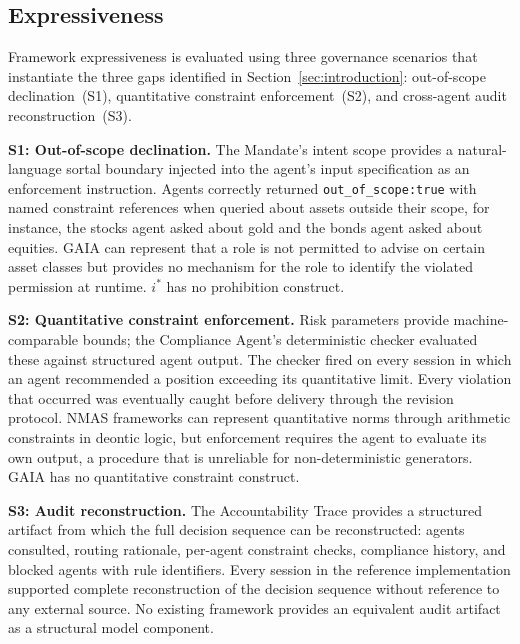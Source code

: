 \documentclass[runningheads]{llncs}
\begin{document}
\subsection{Expressiveness}
\label{sec:expressiveness}

Framework expressiveness is evaluated using three governance scenarios
that instantiate the three gaps identified in
Section~\ref{sec:introduction}: out-of-scope declination~(S1),
quantitative constraint enforcement~(S2), and cross-agent audit
reconstruction~(S3).

\textbf{S1: Out-of-scope declination.} The Mandate's intent scope
provides a natural-language sortal boundary injected into the agent's
input specification as an enforcement instruction. Agents correctly
returned \texttt{out\_of\_scope:true} with named constraint references
when queried about assets outside their scope, for instance, the stocks
agent asked about gold and the bonds agent asked about equities.
GAIA can represent that a role is not permitted to advise on certain
asset classes but provides no mechanism for the role to identify the
violated permission at runtime. $i^*$ has no prohibition construct.

\textbf{S2: Quantitative constraint enforcement.} Risk parameters
provide machine-comparable bounds; the Compliance Agent's deterministic
checker evaluated these against structured agent output. The checker
fired on every session in which an agent recommended a position
exceeding its quantitative limit. Every violation that occurred was
eventually caught before delivery through the revision protocol. NMAS
frameworks can represent quantitative norms through arithmetic
constraints in deontic logic, but enforcement requires the agent to
evaluate its own output, a procedure that is unreliable for
non-deterministic generators. GAIA has no quantitative constraint
construct.

\textbf{S3: Audit reconstruction.} The Accountability Trace provides a
structured artifact from which the full decision sequence can be
reconstructed: agents consulted, routing rationale, per-agent constraint
checks, compliance history, and blocked agents with rule identifiers.
Every session in the reference implementation supported complete
reconstruction of the decision sequence without reference to any
external source. No existing framework provides an equivalent audit
artifact as a structural model component.
\end{document}
